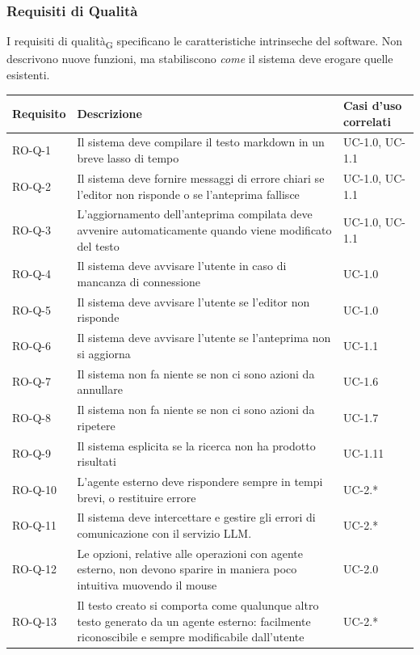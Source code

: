 \documentclass[11pt,a4paper]{article}
\begin{document}
\subsubsection{Requisiti di Qualità}
I requisiti di qualità\textsubscript{G} specificano le caratteristiche intrinseche del software. Non descrivono nuove funzioni, ma stabiliscono \textit{come} il sistema deve erogare quelle esistenti. 
\begin{longtable}{|p{}|>{\raggedright\arraybackslash}p{}|p{}|}
\hline
\textbf{Requisito} & \textbf{Descrizione} & \textbf{Casi d'uso correlati}\\
\hline

RO-Q-1 & Il sistema deve compilare il testo markdown in un breve lasso di tempo & UC-1.0, UC-1.1 \\
\hline
RO-Q-2 & Il sistema deve fornire messaggi di errore chiari se l'editor non risponde o se l'anteprima fallisce & UC-1.0, UC-1.1 \\
\hline
RO-Q-3 & L'aggiornamento dell'anteprima compilata deve avvenire automaticamente quando viene modificato del testo& UC-1.0, UC-1.1 \\
\hline
RO-Q-4 & Il sistema deve avvisare l'utente in caso di mancanza di connessione & UC-1.0 \\
\hline
RO-Q-5 & Il sistema deve avvisare l'utente se l'editor non risponde & UC-1.0 \\
\hline
RO-Q-6 & Il sistema deve avvisare l'utente se l'anteprima non si aggiorna & UC-1.1 \\
\hline
RO-Q-7 & Il sistema non fa niente se non ci sono azioni da annullare & UC-1.6 \\
\hline
RO-Q-8 & Il sistema non fa niente se non ci sono azioni da ripetere & UC-1.7 \\
\hline
RO-Q-9 & Il sistema esplicita se la ricerca non ha prodotto risultati & UC-1.11 \\
\hline
RO-Q-10 & L'agente esterno deve rispondere sempre in tempi brevi, o restituire errore & UC-2.* \\
\hline
RO-Q-11 & Il sistema deve intercettare e gestire gli errori di comunicazione con il servizio LLM. & UC-2.* \\
\hline
RO-Q-12 & Le opzioni, relative alle operazioni con agente esterno, non devono sparire in maniera poco intuitiva muovendo il mouse & UC-2.0 \\
\hline
RO-Q-13 & Il testo creato si comporta come qualunque altro testo generato da un agente esterno: facilmente riconoscibile e sempre modificabile dall'utente & UC-2.* \\

\end{longtable}
\end{document}
